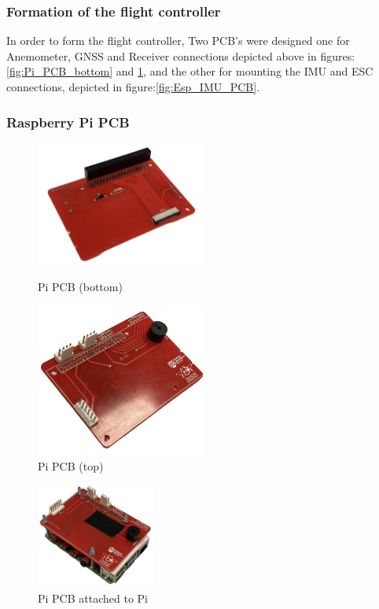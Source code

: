 \documentclass{article}
\begin{document}
\subsubsection*{Formation of the flight controller}
In order to form the flight controller, Two PCB's were designed one for
Anemometer, GNSS and Receiver connections depicted above in
figures:\ref{fig:Pi_PCB_bottom} and \ref{fig:Pi_PCB_top}, and the other for
mounting the IMU and ESC connections, depicted in figure:\ref{fig:Esp_IMU_PCB}.
\subsubsection{Raspberry Pi PCB}
\begin{figure}[H]
  \begin{minipage}{0.5\textwidth}
    \centering
    \includegraphics[width=0.5\textwidth]{Pictures/Pi_PCB_bottom.png}
    \caption{Pi PCB (bottom)}
    \label{fig:Pi_PCB_bottom}
  \end{minipage}
  \begin{minipage}{0.5\textwidth}
    \centering
    \includegraphics[width=0.5\textwidth]{Pictures/Pi_PCB_top.png}
    \caption{Pi PCB (top)}
    \label{fig:Pi_PCB_top}
  \end{minipage}
\end{figure}
\begin{figure}[H]
  \centering
  \includegraphics[width=0.35\textwidth]{Pictures/Pi_PCB_on_Pi.png}
  \caption{Pi PCB attached to Pi}
  \label{fig:Pi_PCB_on_Pi}
\end{figure}
\end{document}
